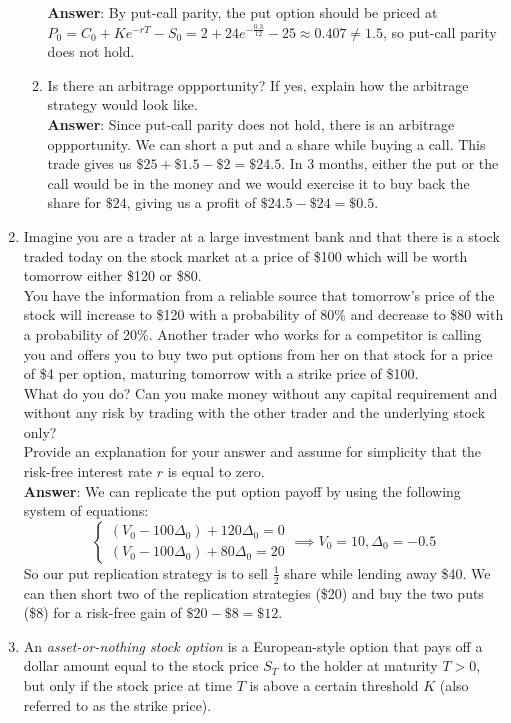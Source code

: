 \documentclass{article}
\begin{document}
\begin{enumerate}
\begin{enumerate}
                        \textbf{Answer}: By put-call parity, the put option should be priced at $P_0=C_0+Ke^{-rT}-S_0=2+24e^{-\frac{0.3}{12}}-25\approx 0.407\neq 1.5$, so put-call parity does not hold.
                  \item Is there an arbitrage oppportunity? If yes, explain how the arbitrage strategy would look like.\\
                        \textbf{Answer}: Since put-call parity does not hold, there is an arbitrage oppportunity. We can short a put and a share while buying a call. This trade gives us $\$25+\$1.5-\$2=\$24.5$. In 3 months, either the put or the call would be in the money and we would exercise it to buy back the share for $\$24$, giving us a profit of $\$24.5-\$24=\$0.5$.
            \end{enumerate}
            \newpage
      \item Imagine you are a trader at a large investment bank and that there is a stock traded today on the stock market at a price of \$100 which will be worth tomorrow either \$120 or \$80.\\
            You have the information from a reliable source that tomorrow's price of the stock will increase to \$120 with a probability of 80\% and decrease to \$80 with a probability of 20\%. Another trader who works for a competitor is calling you and offers you to buy two put options from her on that stock for a price of \$4 per option, maturing tomorrow with a strike price of \$100.\\
            What do you do? Can you make money without any capital requirement and without any risk by trading with the other trader and the underlying stock only?\\
            Provide an explanation for your answer and assume for simplicity that the risk-free interest rate $r$ is equal to zero.\\
            \textbf{Answer}: We can replicate the put option payoff by using the following system of equations: \[\begin{cases}(V_0-100\Delta_0)+120\Delta_0=0 \\(V_0-100\Delta_0)+80\Delta_0=20\end{cases}\implies V_0=10,\Delta_0=-0.5\] So our put replication strategy is to sell $\frac{1}{2}$ share while lending away \$40. We can then short two of the replication strategies (\$20) and buy the two puts (\$8) for a risk-free gain of $\$20-\$8=\$12$.
            \newpage
      \item An \textit{asset-or-nothing stock option} is a European-style option that pays off a dollar amount equal to the stock price $S_T$ to the holder at maturity $T>0$, but only if the stock price at time $T$ is above a certain threshold $K$ (also referred to as the strike price).\\

\end{enumerate}
\end{document}
